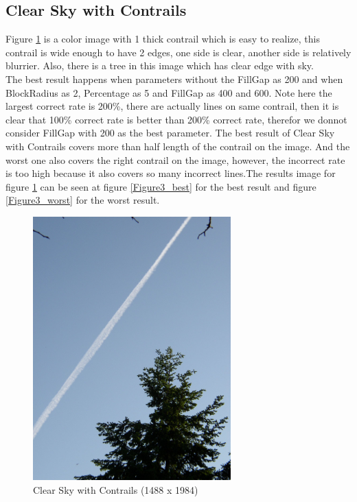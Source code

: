 \clearpage
\subsection{Clear Sky with Contrails}

Figure \ref{figure3} is a color image with 1 thick contrail which is easy to realize, this contrail is wide enough to have 2 edges, one side is clear, another side is relatively blurrier. Also, there is a tree in this image which has clear edge with sky.\\
The best result happens when parameters without the FillGap as 200 and when BlockRadius as 2, Percentage as 5 and FillGap as 400 and 600. Note here the largest correct rate is 200\%, there are actually lines on same contrail, then it is clear that 100\% correct rate is better than 200\% correct rate, therefor we donnot consider FillGap with 200 as the best parameter. The best result of Clear Sky with Contrails covers more than half length of the contrail on the image. And the worst one also covers the right contrail on the image, however, the incorrect rate is too high because it also covers so many incorrect lines.The results image for figure \ref{figure3} can be seen at figure \ref{Figure3_best} for the best result and figure \ref{Figure3_worst} for the worst result.

\begin{figure}[htb!]
\centering
\includegraphics[width=3.0in]{pic/figure3.jpg}
\caption{Clear Sky with Contrails (1488 x 1984)}
\label{figure3}
\end{figure}

